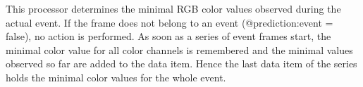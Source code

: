 This processor determines the minimal RGB color values observed during the actual event. If the frame does not belong to an event (@prediction:event = false), no action is performed. As soon as a series of event frames start, the minimal color value for all color channels is remembered and the minimal values observed so far are added to the data item. Hence the last data item of the series holds the minimal color values for the whole event.